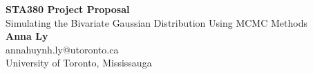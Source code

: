\documentclass{article}
\begin{document}
	\begin{center}
    
    
		\LARGE{\textbf{STA380 Project Proposal}} \\
        \vspace{1em}
        \Large{Simulating the Bivariate Gaussian Distribution Using MCMC Methods} \\
        \vspace{1em}
        \normalsize\textbf{Anna Ly} \\
        \normalsize{annahuynh.ly@utoronto.ca} \\
        \vspace{1em}
        \normalsize{University of Toronto, Mississauga}
     
	\end{center}
\end{document}
